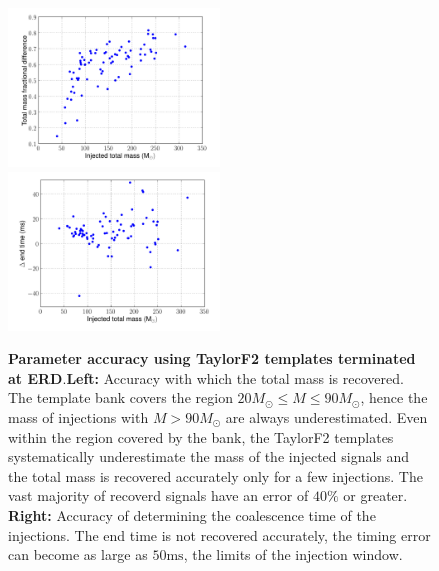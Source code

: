 \begin{figure}
    \includegraphics[width=0.50\textwidth]{figures/ninja1/spa_erd_3_5pn_mass_estimate}
    \includegraphics[width=0.50\textwidth]{figures/ninja1/spa_erd_3_5pn_time_estimate_vs_mt}
\caption{\textbf{Parameter accuracy using TaylorF2 templates terminated at
ERD}.\textbf{Left:} Accuracy with which the total mass is recovered. The
template bank covers the region $20 M_\odot \le M \le 90 M_\odot$, hence
the mass of injections with $M > 90 M_\odot$ are always underestimated.
Even within the region covered by the bank, the TaylorF2 templates
systematically underestimate the mass of the injected signals and the total
mass is recovered accurately only for a few injections.  The vast majority of
recoverd signals have an error of $40\%$ or greater. \textbf{Right:} Accuracy
of determining the coalescence time of the injections.  The end time is not
recovered accurately, the timing error can become as large as $50
\mathrm{ms}$, the limits of the injection window.  }
\label{fig:3_5pn_params}
\end{figure}






